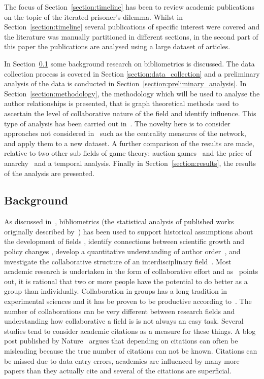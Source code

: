 \documentclass{article}
\theoremstyle{definition}
\begin{document}
The focus of Section~\ref{section:timeline} has been to review academic
publications on the topic of the iterated prisoner's dilemma. Whilst in
Section~\ref{section:timeline} several publications of specific interest were
covered and the literature was manually partitioned in different sections, in
the second part of this paper the publications are analysed using a large
dataset of articles.

In Section~\ref{section:background} some background research on bibliometrics is
discussed. The data collection process is covered in Section
\ref{section:data_collection} and a preliminary analysis of the data is
conducted in Section~\ref{section:preliminary_analysis}. In
Section~\ref{section:methodology}, the methodology which will be used to analyse
the author relationships is presented, that is graph theoretical methods used to
ascertain the level of collaborative nature of the field and identify influence.
This type of analysis has been carried out in~\cite{Liu2015}. The novelty here
is to consider approaches not considered in~\cite{Liu2015} such as the
centrality measures of the network, and apply them to a new dataset. A further
comparison of the results are made, relative to two other sub fields of game
theory: auction games~\cite{menezes2005} and the price of
anarchy~\cite{roughgarden2005} and a temporal analysis. Finally in
Section~\ref{section:results}, the results of the analysis are presented.

\subsection{Background}\label{section:background}

As discussed in~\cite{youngblood2018}, bibliometrics (the statistical analysis
of published works originally described by~\cite{pritchard1969}) has been used
to support historical assumptions about the development of fields
\cite{raina1998}, identify connections between scientific growth and policy
changes \cite{das2016}, develop a quantitative understanding of author
order~\cite{sekara2018}, and investigate the collaborative structure of an
interdisciplinary field~\cite{Liu2015}. Most academic research is undertaken in
the form of collaborative effort and as~\cite{Kyvik2017} points out, it is
rational that two or more people have the potential to do better as a group
than individually. Collaboration in groups has a long tradition in experimental
sciences and it has be proven to be productive according
to~\cite{Etzkowitz1992}. The number of collaborations can be very different
between research fields and understanding how collaborative a field is is not
always an easy task. Several studies tend to consider academic citations as a
measure for these things. A blog post published by Nature~\cite{nature_blog}
argues that depending on citations can often be misleading because the true
number of citations can not be known. Citations can be missed due to data entry
errors, academics are influenced by many more papers than they actually cite and
several of the citations are superficial.
\end{document}
